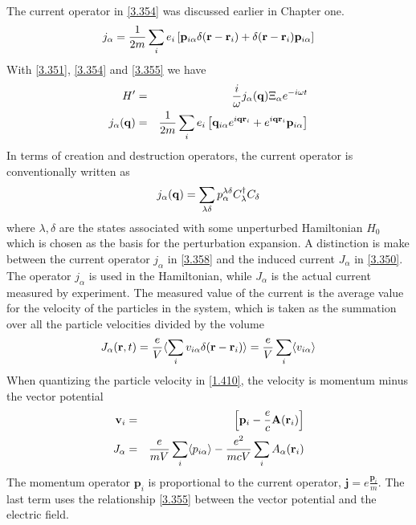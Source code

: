 The current operator in \eqref{3.354} was discussed earlier in Chapter one.
\begin{equation}
    j_\alpha = \frac{1}{2m} \sum_i e_i \left[ \mathbf{p}_{i\alpha} \delta(\mathbf{r}-\mathbf{r}_i) + \delta(\mathbf{r}- \mathbf{r}_i) \mathbf{p}_{i\alpha}  \right] \label{3.356}
\end{equation}
With \eqref{3.351}, \eqref{3.354} and \eqref{3.355} we have
\begin{eqnarray}
    H' &=& \frac{i}{\omega} j_\alpha (\mathbf{q}) \Xi_\alpha e^{-i\omega t}    \label{3.357} \\
    j_\alpha (\mathbf{q}) &=& \frac{1}{2m} \sum_i e_i \left[ \mathbf{q}_{i\alpha} e^{i\mathbf{q} \mathbf{r}_i} + e^{i \mathbf{q} \mathbf{r}_i} \mathbf{p}_{i\alpha}  \right]     \label{3.358}
\end{eqnarray}
In terms of creation and destruction operators, the current operator is conventionally written as
\begin{equation}
    j_\alpha (\mathbf{q}) = \sum_{\lambda \delta} p_\alpha^{\lambda \delta} C^\dagger_\lambda C_\delta     \label{3.359}
\end{equation}
where $\lambda, \delta$ are the states associated with some unperturbed Hamiltonian $H_0$ which is chosen as the basis for the perturbation expansion.
A distinction is make between the current operator $j_\alpha$ in \eqref{3.358} and the induced current $J_\alpha$ in \eqref{3.350}.
The operator $j_\alpha$ is used in the Hamiltonian, while $J_\alpha$ is the actual current measured by experiment.
The measured value of the current is the average value for the velocity of the particles in the system, which is taken as the summation over all the particle velocities divided by the volume
\begin{equation}
    J_\alpha(\mathbf{r},t) = \frac{e}{V} \langle \sum_i v_{i\alpha} \delta(\mathbf{r}-\mathbf{r}_i) \rangle = \frac{e}{V} \sum_i \langle v_{i\alpha} \rangle     \label{3.360}
\end{equation}
When quantizing the particle velocity in \eqref{1.410}, the velocity is momentum minus the vector potential
\begin{eqnarray}
    \mathbf{v}_i &=& \left[ \mathbf{p}_i - \frac{e}{c} \mathbf{A}(\mathbf{r}_i) \right]    \label{3.361} \\
    J_\alpha &=& \frac{e}{mV} \sum_i \langle p_{i\alpha} \rangle - \frac{e^2}{mcV} \sum_i A_\alpha (\mathbf{r}_i)  \label{3.62}
\end{eqnarray}
The momentum operator $\mathbf{p}_i$ is proportional to the current operator, $\mathbf{j} = e \frac{\mathbf{p}_i}{m} $.
The last term uses the relationship \eqref{3.355} between the vector potential and the electric field.
